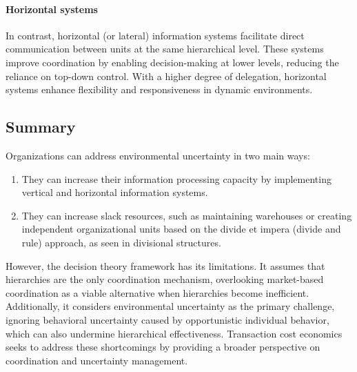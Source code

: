 \paragraph*{Horizontal systems}
In contrast, horizontal (or lateral) information systems facilitate direct communication between units at the same hierarchical level.
These systems improve coordination by enabling decision-making at lower levels, reducing the reliance on top-down control. 
With a higher degree of delegation, horizontal systems enhance flexibility and responsiveness in dynamic environments.

\subsection{Summary}
Organizations can address environmental uncertainty in two main ways: 
\begin{enumerate}
    \item They can increase their information processing capacity by implementing vertical and horizontal information systems.
    \item They can increase slack resources, such as maintaining warehouses or creating independent organizational units based on the divide et impera (divide and rule) approach, as seen in divisional structures.
\end{enumerate}
\noindent However, the decision theory framework has its limitations. 
It assumes that hierarchies are the only coordination mechanism, overlooking market-based coordination as a viable alternative when hierarchies become inefficient. 
Additionally, it considers environmental uncertainty as the primary challenge, ignoring behavioral uncertainty caused by opportunistic individual behavior, which can also undermine hierarchical effectiveness. 
Transaction cost economics seeks to address these shortcomings by providing a broader perspective on coordination and uncertainty management.